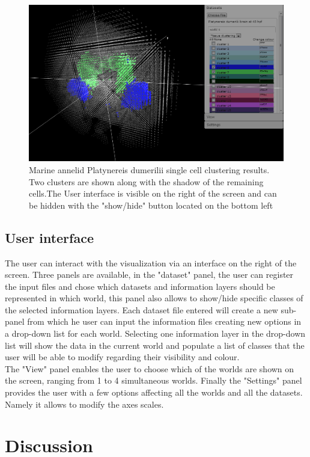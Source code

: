 \documentclass{bioinfo}
\begin{document}
\begin{figure}[h!]%
\centerline{\includegraphics[totalheight=0.2\textheight]{fig1.png}}
\caption{Marine annelid Platynereis dumerilii single cell clustering results. Two clusters are shown along with the shadow of the remaining cells.The User interface is visible on the right of the screen and can be hidden with the "show/hide" button located on the bottom left}\label{fig:01}
\end{figure}

\subsection{User interface}
The user can interact with the visualization via an interface on the right of the screen. Three panels are available, in the "dataset" panel, the user can register the input files and chose which datasets and information layers should be represented in which world, this panel also allows to show/hide specific classes of the selected information layers. Each dataset file entered will create a new sub-panel from which he user can input the information files creating new options in a drop-down list for each world. Selecting one information layer in the drop-down list will show the data in the current world and populate a list of classes that the user will be able to modify regarding their visibility and colour.\\
The "View" panel enables the user to choose which of the worlds are shown on the screen, ranging from 1 to 4 simultaneous worlds.
Finally the "Settings" panel provides the user with a few options affecting all the worlds and all the datasets. Namely it allows to modify the axes scales.


\section{Discussion}
\end{document}
